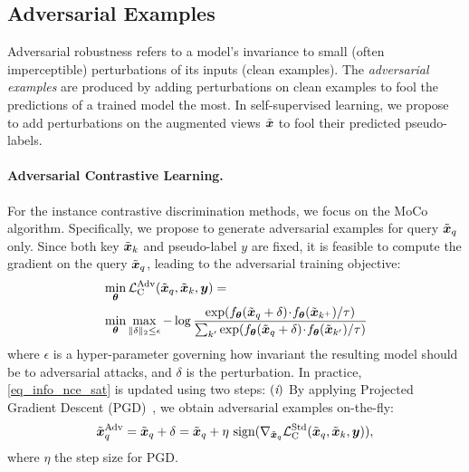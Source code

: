 \documentclass[10pt,twocolumn,letterpaper]{article}
\newcommand{\RN}[1]{\textup{\lowercase\expandafter{\it \romannumeral#1}}}
\newcommand{\xv}{\boldsymbol{x}}
\newcommand{\yv}{\boldsymbol{y}}
\newcommand{\thetav}{\boldsymbol{\theta}}
\newcommand{\Lcal}{\mathcal{L}}
\begin{document}
\subsection{Adversarial Examples}
Adversarial robustness refers to a model’s invariance to small (often imperceptible) perturbations of its inputs (\ie clean examples). The {\em adversarial examples} are produced by adding perturbations on clean examples to fool the predictions of a trained model the most. In self-supervised learning,  we propose to add perturbations on the augmented views $\Tilde{\xv}$ to fool their predicted pseudo-labels. 



\paragraph{Adversarial Contrastive Learning.}
For the instance contrastive discrimination methods, we focus on the MoCo algorithm. Specifically, we propose to generate adversarial examples for query $\Tilde{\xv}_q$ only. Since both key $\Tilde{\xv}_{k}$ and pseudo-label $y$ are fixed, it is feasible to compute the gradient on the query $\Tilde{\xv}_q$, leading to the adversarial training objective:  
\begin{align} 
\hspace{-0mm}
& \min_{\thetav} \Lcal^{\text{Adv}}_{\text{C}} ( \Tilde{\xv}_q, \Tilde{\xv}_{k}, \yv) = \nonumber\\
& \min_{\thetav} \max_{ \| \delta \|_{2} \le \epsilon } 
-\log \frac{\exp(f_{\thetav} (\Tilde{\xv}_q + \delta) \! \cdot\! f_{\thetav} (\Tilde{\xv}_{ k^+})/\tau)}{ \sum_{k'}\exp(f_{\thetav} (\Tilde{\xv}_q + \delta) \!\cdot\! f_{\thetav} (\Tilde{\xv}_{k'}) /\tau) }
\label{eq_info_nce_sat}
\end{align}
where $\epsilon$ is a hyper-parameter governing how invariant the resulting model should be to adversarial attacks, 
and $\delta$ is the perturbation. In practice, \eqref{eq_info_nce_sat} is updated using two steps:  
$(\RN{1})$ 
By applying Projected Gradient Descent (PGD)~\cite{goodfellow2014explaining,bubeck2014convex}, we obtain adversarial examples on-the-fly:
\begin{align} 
\hspace{-0mm}
\Tilde{\xv}^{\text{Adv}}_q  = \Tilde{\xv}_q + \delta 
 = \Tilde{\xv}_q + \eta ~ \text{sign} ( \nabla_{\Tilde{\xv}_q} \Lcal^{\text{Std}}_{\text{C}} ( \Tilde{\xv}_q, \Tilde{\xv}_{k}, \yv) ), 
\label{eq_info_nce_adv_example}
\end{align}
where $ \eta $ the step size for PGD.
\end{document}
